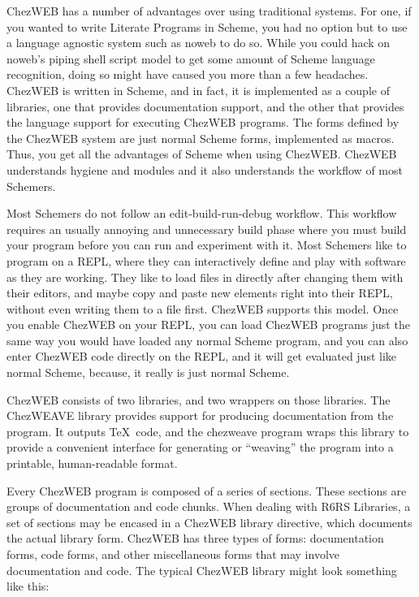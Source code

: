 ChezWEB has a number of advantages over using traditional systems.
For one, if you wanted to write Literate Programs in Scheme, you had
no option but to use a language agnostic system such as noweb to do
so.  While you could hack on noweb's piping shell script model to get
some amount of Scheme language recognition, doing so might have caused
you more than a few headaches.  ChezWEB is written in Scheme, and in
fact, it is implemented as a couple of libraries, one that provides
documentation support, and the other that provides the language
support for executing ChezWEB programs.  The forms defined by the
ChezWEB system are just normal Scheme forms, implemented as macros.
Thus, you get all the advantages of Scheme when using
ChezWEB.  ChezWEB understands hygiene and modules and it
also understands the workflow of most Schemers.

Most Schemers do not follow an edit-build-run-debug workflow.  This
workflow requires an usually annoying and unnecessary build phase
where you must build your program before you can run and experiment
with it.  Most Schemers like to program on a REPL, where they can
interactively define and play with software as they are working.  They
like to load files in directly after changing them with their editors,
and maybe copy and paste new elements right into their REPL, without
even writing them to a file first.  ChezWEB supports this model.  Once
you enable ChezWEB on your REPL, you can load ChezWEB programs just
the same way you would have loaded any normal Scheme program, and you
can also enter ChezWEB code directly on the REPL, and it will get
evaluated just like normal Scheme, because, it really is just normal
Scheme.

ChezWEB consists of two libraries, and two wrappers on those
libraries.  The ChezWEAVE library provides support for producing
documentation from the program.  It outputs \TeX\ code, and the
chezweave program wraps this library to provide a convenient interface
for generating or ``weaving'' the program into a printable,
human-readable format.

%
Every ChezWEB program is composed of a series of sections.  These
sections are groups of documentation and code chunks.  When dealing
with R6RS Libraries, a set of sections may be encased in a ChezWEB
library directive, which documents the actual library form.  ChezWEB
has three types of forms: documentation forms, code forms, and
other miscellaneous forms that may involve documentation and code.
The typical ChezWEB library might look something like this:

